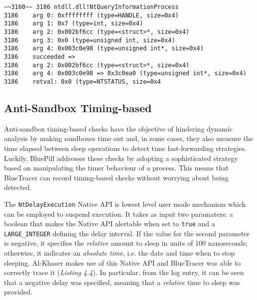 \vspace{0.5cm}
\begin{lstlisting}[caption={Log entry relative to \texttt{NtQueryInformationProcess}},captionpos=b]
~~3160~~ 3186 ntdll.dll!NtQueryInformationProcess
3186 	arg 0: 0xffffffff (type=HANDLE, size=0x4)
3186 	arg 1: 0x7 (type=int, size=0x4)
3186 	arg 2: 0x002bf6cc (type=<struct>*, size=0x4)
3186 	arg 3: 0x0 (type=unsigned int, size=0x4)
3186 	arg 4: 0x003c0e98 (type=unsigned int*, size=0x4)
3186    succeeded =>
3186 	arg 2: 0x002bf6cc (type=<struct>*, size=0x4)
3186 	arg 4: 0x003c0e98 => 0x3c0ea0 (type=unsigned int*, size=0x4)
3186 	retval: 0x0 (type=NTSTATUS, size=0x4
\end{lstlisting}

\subsection{Anti-Sandbox Timing-based}

Anti-sandbox timing-based checks have the objective of hindering dynamic analysis by making sandboxes time out and, in some cases, they also measure the time elapsed between sleep operations to detect time fast-forwarding strategies. Luckily, BluePill \cite{BluePill} addresses these checks by adopting a sophisticated strategy based on manipulating the timer behaviour of a process. This means that BlueTracer can record timing-based checks without worrying about being detected.

The \texttt{NtDelayExecution} Native API is lowest level user mode mechanism which can be employed to suspend execution. It takes as input two paramaters: a boolean that makes the Native API alertable when set to \texttt{true} and a \texttt{LARGE\_INTEGER} defining the delay interval. If the value for the second parameter is negative, it specifies the \textit{relative} amount to sleep in units of 100 nanoseconds; otherwise, it indicates an \textit{absolute time}, i.e. the date and time when to stop sleeping. Al-Khaser makes use of this Native API and BlueTracer was able to correctly trace it (\textit{Listing 4.4}). In particular, from the log entry, it can be seen that a negative delay was specified, meaning that a \textit{relative} time to sleep was provided.  

